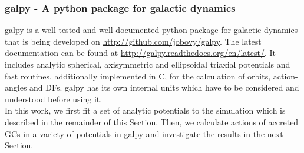 \subsubsection{galpy - A python package for galactic dynamics}\label{subsubsec:galpy}
galpy \citep{Bovy...galpy...2015} is a well tested and well documented python package for galactic dynamics that is being developed on \url{http://github.com/jobovy/galpy}. The latest documentation can be found at \url{http://galpy.readthedocs.org/en/latest/}. It includes analytic spherical, axisymmetric and ellipsoidal triaxial potentials and fast routines, additionally implemented in C, for the calculation of orbits, action-angles and \acp{DF}. galpy has its own internal units which have to be considered and understood before using it.
\\In this work, we first fit a set of analytic potentials to the simulation which is described in the remainder of this Section. Then, we calculate actions of accreted \acp{GC} in a variety of potentials in galpy and investigate the results in the next Section. 

